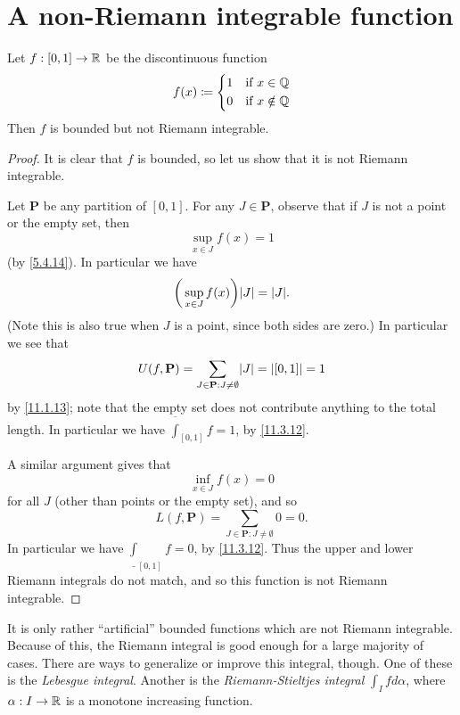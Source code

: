 \section{A non-Riemann integrable function}\label{sec:11.7}

\begin{prop}\label{11.7.1}
  Let \(f : [0, 1] \to \mathbb{R}\) be the discontinuous function
  \[
    f(x) \coloneqq \begin{dcases}
      1 & \text{if } x \in \mathbb{Q}    \\
      0 & \text{if } x \notin \mathbb{Q}
    \end{dcases}
  \]
  Then \(f\) is bounded but not Riemann integrable.
\end{prop}

\begin{proof}
  It is clear that \(f\) is bounded, so let us show that it is not Riemann integrable.

  Let \(\mathbf{P}\) be any partition of \([0, 1]\).
  For any \(J \in \mathbf{P}\), observe that if \(J\) is not a point or the empty set, then
  \[
    \sup_{x \in J} f(x) = 1
  \]
  (by \cref{5.4.14}).
  In particular we have
  \[
    \bigg(\sup_{x \in J} f(x)\bigg) \abs{J} = \abs{J}.
  \]
  (Note this is also true when \(J\) is a point, since both sides are zero.)
  In particular we see that
  \[
    U(f, \mathbf{P}) = \sum_{J \in \mathbf{P} : J \neq \emptyset} \abs{J} = \abs{[0, 1]} = 1
  \]
  by \cref{11.1.13};
  note that the empty set does not contribute anything to the total length.
  In particular we have \(\overline{\int}_{[0, 1]} f = 1\), by \cref{11.3.12}.

  A similar argument gives that
  \[
    \inf_{x \in J} f(x) = 0
  \]
  for all \(J\) (other than points or the empty set), and so
  \[
    L(f, \mathbf{P}) = \sum_{J \in \mathbf{P} : J \neq \emptyset} 0 = 0.
  \]
  In particular we have \(\underline{\int}_{[0, 1]} f = 0\), by \cref{11.3.12}.
  Thus the upper and lower Riemann integrals do not match, and so this function is not Riemann integrable.
\end{proof}

\begin{rmk}\label{11.7.2}
  It is only rather ``artificial'' bounded functions which are not Riemann integrable.
  Because of this, the Riemann integral is good enough for a large majority of cases.
  There are ways to generalize or improve this integral, though.
  One of these is the \emph{Lebesgue integral}.
  Another is the \emph{Riemann-Stieltjes integral} \(\int_I f d\alpha\), where \(\alpha : I \to \mathbb{R}\) is a monotone increasing function.
\end{rmk}
